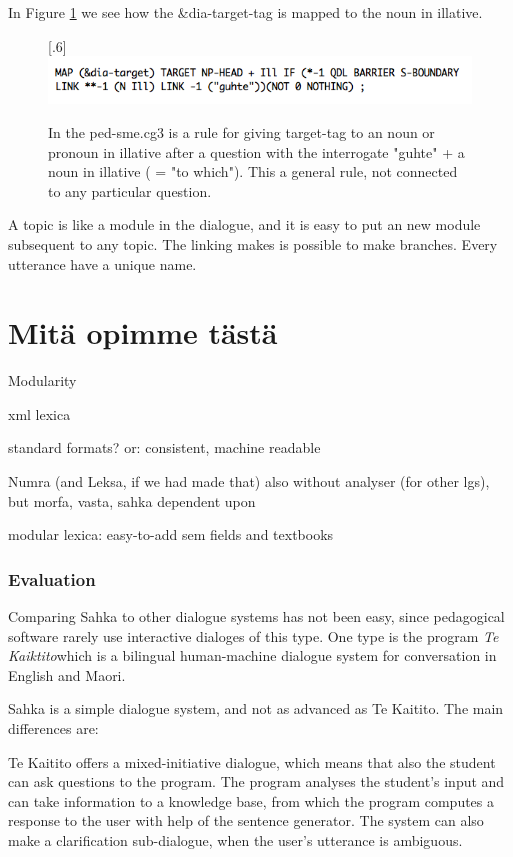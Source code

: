 \documentclass[a4paper,12pt]{article}
\begin{document}
In Figure \ref{targetIll} we see how the \&dia-target-tag is mapped to the noun in illative.

\begin{figure}[htbp]
\begin{center}
\scalebox{.6}[.6]{\includegraphics{img/targetIll.png}}
\caption{In the ped-sme.cg3 is a rule for giving target-tag to an noun or pronoun in illative after a question with the interrogate "guhte" + a noun in illative ( = "to which"). This a general rule, not connected to any particular question.}
\label{targetIll}
\end{center}
\end{figure}


A topic is like a module in the dialogue, and it is easy to put an new module subsequent to any topic. The linking makes is possible to make branches. Every utterance have a unique name.  


\section{Mitä opimme tästä}

Modularity

xml lexica

standard formats? or: consistent, machine readable

Numra (and Leksa, if we had made that) also without analyser (for other lgs), but morfa, vasta, sahka dependent upon

modular lexica: easy-to-add sem fields and textbooks



\subsubsection{Evaluation}

Comparing Sahka to other dialogue systems has not been easy, since pedagogical software rarely use interactive dialoges of this type. One type is the program \textit{Te Kaiktito}which is a bilingual human-machine dialogue system for conversation in English and Maori.

Sahka is a simple dialogue system, and not as advanced as Te Kaitito. The main differences are:

Te Kaitito offers a mixed-initiative dialogue, which means that also the student can ask questions to the program. The program analyses the student's input and can take information to a knowledge base, from which the program computes a response to the user with help of the sentence generator. The system can also make a clarification sub-dialogue, when the user's utterance is ambiguous. \citep{KnotMoorMean200350}
\end{document}
